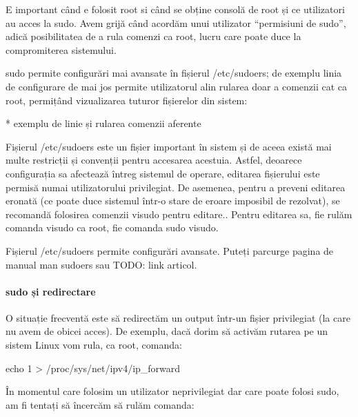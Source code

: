 \begin{note}[NOTĂ]

E important când e folosit root si când se obține consolă de root și ce
utilizatori au acces la sudo. Avem grijă când acordăm unui utilizator
“permisiuni de sudo”, adică posibilitatea de a rula comenzi ca root, lucru care
poate duce la compromiterea sistemului.

\end{note}

sudo permite configurări mai avansate în fișierul /etc/sudoers; de exemplu linia
de configurare de mai jos permite utilizatorul alin rularea doar a comenzii cat
ca root, permițând vizualizarea tuturor fișierelor din sistem:

* exemplu de linie și rularea comenzii aferente

Fișierul /etc/sudoers este un fișier important în sistem și de aceea există mai
multe restricții și convenții pentru accesarea acestuia. Astfel, deoarece
configurația sa afectează întreg sistemul de operare, editarea fișierului este
permisă numai utilizatorului privilegiat. De asemenea, pentru a preveni editarea
eronată (ce poate duce sistemul într-o stare de eroare imposibil de rezolvat),
se recomandă folosirea comenzii visudo pentru editare.. Pentru editarea sa, fie
rulăm comanda visudo ca root, fie comanda sudo visudo.

\begin{note}[NOTĂ]

Fișierul /etc/sudoers permite configurări avansate. Puteți parcurge pagina
de manual man sudoers sau TODO: link articol.

\end{note}

\paragraph{sudo și redirectare}

O situație frecventă este să redirectăm un output într-un fișier privilegiat (la
care nu avem de obicei acces). De exemplu, dacă dorim să activăm rutarea pe un
sistem Linux vom rula, ca root, comanda:

\begin{screen}
echo 1 > /proc/sys/net/ipv4/ip_forward
\end{screen}

În momentul care folosim un utilizator neprivilegiat dar care poate folosi sudo,
am fi tentați să încercăm să rulăm comanda:

